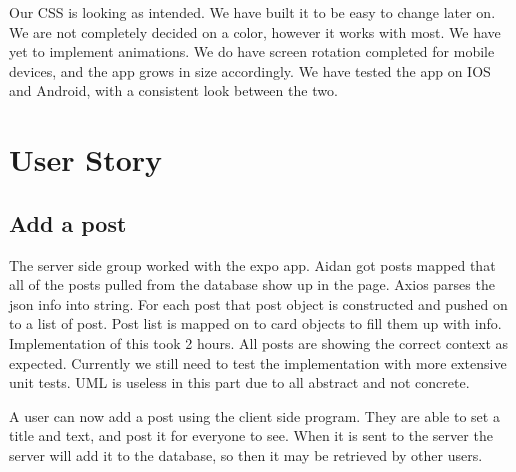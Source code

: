 \documentclass[12pt]{article}
\begin{document}
Our CSS is looking as intended. We have built it to be easy to change later on.
We are not completely decided on a color, however it works with most. We have
yet to implement animations. We do have screen rotation completed for mobile
devices, and the app grows in size accordingly. We have tested the app on IOS
and Android, with a consistent look between the two.

\section{User Story}

\subsection{Add a post}
The server side group worked with the expo app. Aidan got posts mapped that all
of the posts pulled from the database show up in the page. Axios parses the json
info into string. For each post that post object is constructed and pushed on to
a list of post. Post list is mapped on to card objects to fill them up with
info. Implementation of this took 2 hours. All posts are showing the correct
context as expected. Currently we still need to test the implementation with
more extensive unit tests. UML is useless in this part due to all abstract and
not concrete.

A user can now add a post using the client side program.  They are able to set a
title and text, and post it for everyone to see.  When it is sent to the server
the server will add it to the database, so then it may be retrieved by other users.
\end{document}
